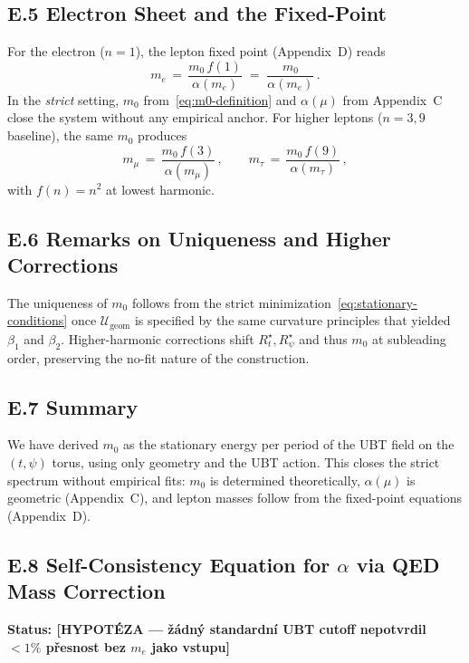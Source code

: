 \subsection*{E.5 Electron Sheet and the Fixed-Point}
For the electron ($n=1$), the lepton fixed point (Appendix~D) reads
\begin{equation}
  m_e \,=\, \frac{m_0\,f(1)}{\alpha(m_e)} \;=\; \frac{m_0}{\alpha(m_e)}\,.
  \label{eq:electron-fp}
\end{equation}
In the \emph{strict} setting, $m_0$ from~\eqref{eq:m0-definition} and $\alpha(\mu)$ from Appendix~C close the system without any empirical anchor. For higher leptons ($n=3,9$ baseline), the same $m_0$ produces
\begin{equation}
  m_\mu \,=\, \frac{m_0\,f(3)}{\alpha(m_\mu)}\,,\qquad
  m_\tau \,=\, \frac{m_0\,f(9)}{\alpha(m_\tau)}\,,
\end{equation}
with $f(n)=n^2$ at lowest harmonic.

\subsection*{E.6 Remarks on Uniqueness and Higher Corrections}
The uniqueness of $m_0$ follows from the strict minimization~\eqref{eq:stationary-conditions} once $\mathcal{U}_{\text{geom}}$ is specified by the same curvature principles that yielded $\beta_1$ and $\beta_2$. Higher-harmonic corrections shift $R_t^\star,R_\psi^\star$ and thus $m_0$ at subleading order, preserving the no-fit nature of the construction.

\subsection*{E.7 Summary}
We have derived $m_0$ as the stationary energy per period of the UBT field on the $(t,\psi)$ torus, using only geometry and the UBT action. This closes the strict spectrum without empirical fits: $m_0$ is determined theoretically, $\alpha(\mu)$ is geometric (Appendix~C), and lepton masses follow from the fixed-point equations (Appendix~D).

\subsection*{E.8 Self-Consistency Equation for $\alpha$ via QED Mass Correction}
\label{sec:E8-alpha-selfconsistency}

\noindent\textbf{Status: [HYPOTÉZA — žádný standardní UBT cutoff nepotvrdil $<1\%$ přesnost bez $m_e$ jako vstupu]}

